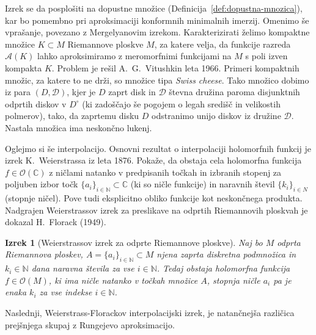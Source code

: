 \documentclass[12pt,a4paper,twoside]{article}
\theoremstyle{definition} %
\theoremstyle{plain} %
\newtheorem{izrek}[definicija]{Izrek}
\numberwithin{equation}{section}  %
\newcommand{\N}{\mathbb N}
\newcommand{\C}{\mathbb C}
\begin{document}
Izrek se da posplošiti na dopustne množice (Definicija~\ref{def:dopustna-mnozica}), kar bo pomembno pri aproksimaciji konformnih minimalnih imerzij. \newline
Omenimo še vprašanje, povezano z Mergelyanovim izrekom. Karakterizirati želimo kompaktne množice $K \subset M$ Riemannove ploskve $M$, za katere velja, da funkcije razreda $\mathcal{A}(K)$ lahko aproksimiramo z meromorfnimi funkcijami na $M$ s poli izven kompakta $K$. Problem je rešil A.~G.~Vitushkin leta 1966. Primeri kompaktnih množic, za katere to ne drži, so množice tipa \emph{Swiss cheese}. Tako množico dobimo iz para $(D, \mathcal{D})$, kjer je $D$ zaprt disk in $\mathcal{D}$ števna družina paroma disjunktnih odprtih diskov v $D^{\circ}$ (ki zadoščajo še pogojem o legah središč in velikostih polmerov), tako, da zaprtemu disku $D$ odstranimo unijo diskov iz družine $\mathcal{D}$. Nastala množica ima neskončno lukenj. \newline

Oglejmo si še interpolacijo.
Osnovni rezultat o interpolaciji holomorfnih funkcij je izrek K.~Weierstrassa iz leta 1876. Pokaže, da obstaja cela holomorfna funkcija $f \in \mathcal{O}(\C)$ z ničlami natanko v predpisanih točkah in izbranih stopenj za poljuben izbor točk $\{ a_{i} \}_{i \in \N} \subset \C$ (ki so ničle funkcije) in naravnih števil $\{ k_{i} \}_{i \in N}$ (stopnje ničel). Pove tudi eksplicitno obliko funkcije kot neskončnega produkta.
Nadgrajen Weierstrassov izrek za preslikave na odprtih Riemannovih ploskvah je dokazal H.~Florack (1949).

\begin{izrek} [Weierstrassov izrek za odprte Riemannove ploskve] \label{izr:Weierstrass}
Naj bo $M$ odprta Riemannova ploskev, $A = \{a_{i}\}_{i \in \N} \subset M$ njena zaprta diskretna podmnožica in $k_{i} \in \N$ dana naravna števila za vse $i \in \N$.
Tedaj obstaja holomorfna funkcija $f \in \mathcal{O}(M)$, ki ima ničle natanko v točkah množice $A$, stopnja ničle $a_{i}$ pa je enaka $k_{i}$ za vse indekse $i \in \N$.
\end{izrek}

Naslednji, Weierstrass-Florackov interpolacijski izrek, je natančnejša različica prejšnjega skupaj z Rungejevo aproksimacijo.
\end{document}
